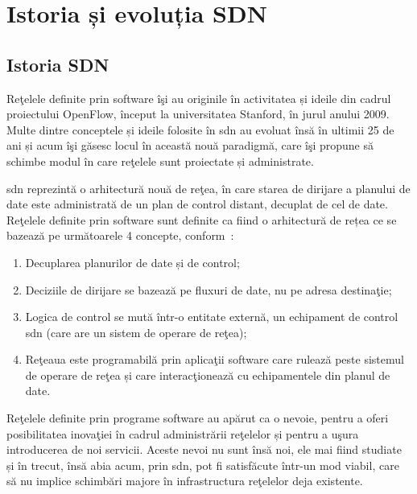 \section{Istoria și evoluția SDN}

\subsection{Istoria SDN}

Reţelele definite prin software îşi au originile în activitatea și ideile din cadrul proiectului OpenFlow, început la universitatea Stanford, în jurul anului 2009. Multe dintre conceptele și ideile folosite în \gls{sdn} au evoluat însă în ultimii 25 de ani și acum îşi găsesc locul în această nouă paradigmă, care îşi propune să schimbe modul în care reţelele sunt proiectate și administrate.

\gls{sdn} reprezintă o arhitectură nouă de reţea, în care starea de dirijare a planului de date este administrată de un plan de control distant, decuplat de cel de date. Reţelele definite prin software sunt definite ca fiind o arhitectură de rețea ce se bazează pe următoarele 4 concepte, conform~\cite{kreutz2015software}:
\begin{enumerate}
	\item Decuplarea planurilor de date și de control;
	\item Deciziile de dirijare se bazează pe fluxuri de date, nu pe adresa destinaţie;
	\item Logica de control se mută într-o entitate externă, un echipament de control \gls{sdn} (care are un sistem de operare de reţea);
	\item Reţeaua este programabilă prin aplicaţii software care rulează peste sistemul de operare de reţea și care interacţionează cu echipamentele din planul de date.
\end{enumerate}

Reţelele definite prin programe software au apărut ca o nevoie, pentru a oferi posibilitatea inovaţiei în cadrul administrării reţelelor și pentru a uşura introducerea de noi servicii. Aceste nevoi nu sunt însă noi, ele mai fiind studiate și în trecut, însă abia acum, prin \gls{sdn}, pot fi satisfăcute într-un mod viabil, care să nu implice schimbări majore în infrastructura reţelelor deja existente.

